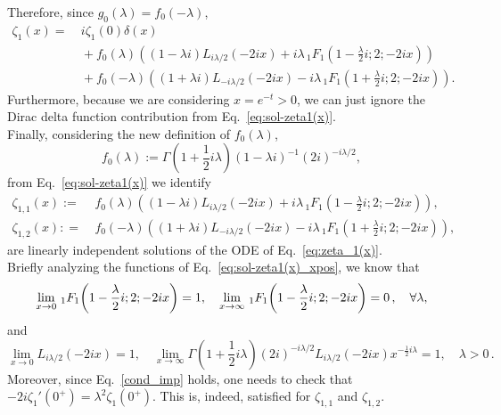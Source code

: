 \documentclass[
 aip,
 jmp,
 amsmath,amssymb,
 reprint,
 nofootinbib,
]{revtex4-2}
\begin{document}
Therefore, since $g_0(\lambda)=f_0(-\lambda)$,
\begin{equation}\label{eq:sol-zeta1(x)}
\begin{aligned}
\zeta_1(x)= &~{}i \zeta_1(0)\delta(x) \\%
&~{} + f_0(\lambda) \left(  (1-\lambda i)  L_{i \lambda/2}(-2 i x)  + i\lambda \, _1F_1\left(1- \frac{\lambda}2 i ;2;-2 i x \right) \right)\\
&~{} + f_0(-\lambda) \left( (1+ \lambda i)L_{-i \lambda/2}(-2 i x) - i\lambda \, _1F_1\left(1+  \frac{\lambda}2i ;2;-2 i x \right)\right).
\end{aligned}
\end{equation}
Furthermore, because we are considering $x = e^{-t} > 0$, we can just ignore the Dirac delta function contribution from Eq.~\eqref{eq:sol-zeta1(x)}.\\

Finally, considering the new definition of $f_0(\lambda)$,
\begin{equation}
f_0(\lambda):= \Gamma(1+\frac12i\lambda)  (1-\lambda i)^{-1}(2i)^{-i\lambda/2},
\end{equation}
from Eq.~\eqref{eq:sol-zeta1(x)} we identify
\begin{equation}\label{eq:sol-zeta1(x)_xpos}
\begin{aligned}
\zeta_{1,1}(x) := &~{} f_0(\lambda) \left(  (1-\lambda i)  L_{i \lambda/2}(-2 i x)+ i \lambda \, _1F_1\left(1- \frac{\lambda}2 i ;2;-2 i x \right) \right),\\
\zeta_{1,2}(x) : =  &~{}  f_0(-\lambda) \left( (1+ \lambda i)L_{-i \lambda/2}(-2 i x) -i \lambda \, _1F_1\left(1+  \frac{\lambda}2i ;2;-2 i x \right)\right),
\end{aligned}
\end{equation}
are linearly independent solutions of the ODE of Eq.~\eqref{eq:zeta_1(x)}.\\

Briefly analyzing the functions of Eq.~\eqref{eq:sol-zeta1(x)_xpos}, we know that
\begin{equation*}
    \lim_{x\to 0}\,_1F_1\qty(1-\frac{\lambda}{2}i;2;-2ix)=1, \quad  \lim_{x\to\infty}\,_1F_1\qty(1-\frac{\lambda}{2}i;2;-2ix)=0\,, \quad \forall \lambda,
\end{equation*}
and
\begin{equation*}
    \lim_{x\to 0}L_{i\lambda/2}(-2ix)=1,\quad   \lim_{x\to\infty} \Gamma \left( 1+\frac12i\lambda \right) (2i)^{-i\lambda/2} L_{i\lambda/2}(-2ix) x^{-\frac12i\lambda}=1,\quad \lambda>0\,.
\end{equation*}
Moreover, since Eq.~\eqref{cond_imp} holds, one needs to check that $-2i \zeta_1'(0^+) = \lambda^2 \zeta_1(0^+)$. This is, indeed, satisfied for $\zeta_{1,1}$ and $\zeta_{1,2}$.\\
\end{document}
